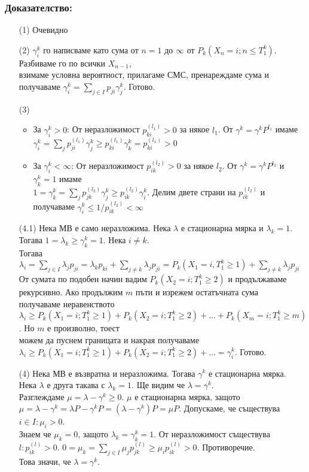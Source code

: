 \documentclass{article}
\begin{document}
\subsubsection*{Доказателство:}
\begin{enumerate}
\item[(1)] Очевидно
\item[(2)] $\gamma_i^k$ го написваме като сума от $n=1$ до $\infty$ от $P_k(X_n = i; n \leq T_1^k)$. Разбиваме го по всички $X_{n-1}$, \\
взимаме условна вероятност, прилагаме СМС, пренареждаме сума и получаваме $\gamma_i^k = \sum_{j \in I} p_{ji}\gamma_j^k$. Готово.
\item[(3)] 
\begin{itemize}
\item За $\gamma_i^k > 0$: От неразложимост $p_{ki}^{(l_1)} > 0$ за някое $l_1$. От $\gamma^k = \gamma^k P^{l_1}$ имаме \\
$\gamma_i^k = \sum_j p_{ji}^{(l_1)}\gamma_j^k \geq p_{ki}^{(l_1)}\gamma_k^k = p_{ki}^{(l_1)} > 0$
\item За $\gamma_i^k < \infty$: От неразложимост $p_{ik}^{(l_2)} > 0$ за някое $l_2$. От $\gamma^k = \gamma^k P^{l_2}$ и $\gamma_k^k = 1$ имаме \\
$1 = \gamma_k^k = \sum_j p_{jk}^{(l_2)}\gamma_j^k \geq p_{ik}^{(l_2)}\gamma_i^k$. Делим двете страни на $p_{ik}^{(l_2)}$ и получаваме $\gamma_i^k \leq 1/p_{ik}^{(l_2)} < \infty$
\end{itemize}
\item[(4.1)] Нека МВ е само неразложима. Нека $\lambda$ е стационарна мярка и $\lambda_k = 1$. Тогава $1 = \lambda_k \geq \gamma_k^k = 1$. Нека $i \neq k$. \\
Тогава $\lambda_i = \sum_{j \in I} \lambda_j p_{ji} = \lambda_k p_{ki} + \sum_{j \neq k} \lambda_j p_{ji} = P_k(X_1 = i, T_1^k \geq 1) + \sum_{j \neq k} \lambda_j p_{ji}$ \\
От сумата по подобен начин вадим $P_k(X_2 = i; T_1^k \geq 2)$ и продължаваме рекурсивно. Ако продължим $m$ пъти и изрежем остатъчната сума \\
получаваме неравенството $\lambda_i \geq P_k(X_1 = i; T_1^k \geq 1) + P_k(X_2 = i; T_1^k \geq 2) + \dots + P_k(X_m = i; T_1^k \geq m)$. Но $m$ е произволно, тоест \\
можем да пуснем границата и накрая получаваме $\lambda_i \geq P_k(X_1 = i; T_1^k \geq 1) + P_k(X_2 = i; T_1^k \geq 2) + \dots = \gamma_i^k$. Готово.
\item[(4)] Нека МВ е възвратна и неразложима. Тогава $\gamma^k$ е стационарна мярка. Нека $\lambda$ е друга такава с $\lambda_k = 1$. Ще видим че $\lambda = \gamma^k$. \\
Разглеждаме $\mu = \lambda - \gamma^k \geq 0$. $\mu$ е стационарна мярка, защото $\mu = \lambda - \gamma^k = \lambda P - \gamma^k P = (\lambda - \gamma^k)P = \mu P$. Допускаме, че съществува $i \in I: \mu_i > 0$. \\
Знаем че $\mu_k = 0$, защото $\lambda_k = \gamma_k^k = 1$. От неразложимост съществува $l: p_{ik}^{(l)} > 0$. $0 = \mu_k = \sum_{j \in I} \mu_j p_{jk}^{(l)} \geq \mu_i p_{ik}^{(l)} > 0$. Противоречие. \\
Това значи, че $\lambda = \gamma^k$.
\end{enumerate}
\end{document}

